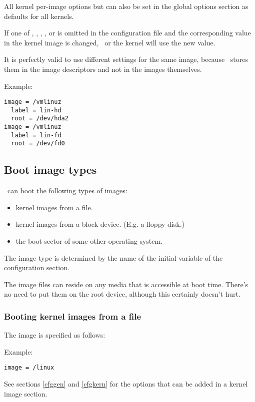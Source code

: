 All kernel per-image options but  can also be set in the global
options section as defaults for all kernels.

If one of , , , ,
or  is omitted in the configuration file and the
corresponding value in the kernel image is changed, \LILO\ or the kernel
will use the new value.

It is perfectly valid to use different settings for the same
image, because \LILO\ stores them in the image descriptors and not in the
images themselves.

Example:
\begin{verbatim}
image = /vmlinuz
  label = lin-hd
  root = /dev/hda2
image = /vmlinuz
  label = lin-fd
  root = /dev/fd0
\end{verbatim}


\subsection{Boot image types}
\label{bootimg}

\LILO\ can boot the following types of images:
\begin{itemize}
  \item kernel images from a file.
  \item kernel images from a block device. (E.g. a floppy disk.)
  \item the boot sector of some other operating system.
\end{itemize}

The image type is determined by the name of the initial
variable of the configuration section.

The image files can reside on any media that is accessible at boot time.
There's no need to put them on the root device, although this certainly
doesn't hurt.


\subsubsection{Booting kernel images from a file}

The image is specified as follows: 

Example:
\begin{verbatim}
image = /linux
\end{verbatim}

See sections \ref{cfggen} and \ref{cfgkern} for the options that can be
added in a kernel image section.


